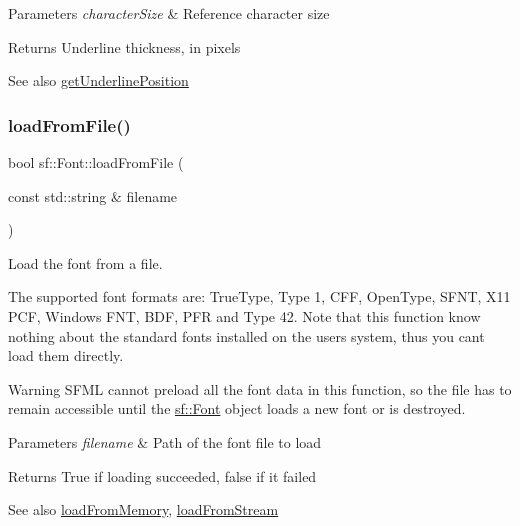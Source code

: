 \begin{DoxyParams}{Parameters}
{\em character\+Size} & Reference character size\\
\hline
\end{DoxyParams}
\begin{DoxyReturn}{Returns}
Underline thickness, in pixels
\end{DoxyReturn}
\begin{DoxySeeAlso}{See also}
\hyperlink{classsf_1_1_font_a726a55f40c19ac108e348b103190caad}{get\+Underline\+Position} 
\end{DoxySeeAlso}
\mbox{\label{classsf_1_1_font_ab020052ef4e01f6c749a85571c0f3fd1}} 
\subsubsection{\texorpdfstring{load\+From\+File()}{loadFromFile()}}
{\footnotesize\ttfamily bool sf\+::\+Font\+::load\+From\+File (\begin{DoxyParamCaption}\item[{const std\+::string \&}]{filename }\end{DoxyParamCaption})}



Load the font from a file. 

The supported font formats are\+: True\+Type, Type 1, C\+FF, Open\+Type, S\+F\+NT, X11 P\+CF, Windows F\+NT, B\+DF, P\+FR and Type 42. Note that this function know nothing about the standard fonts installed on the user\textquotesingle{}s system, thus you can\textquotesingle{}t load them directly.

\begin{DoxyWarning}{Warning}
S\+F\+ML cannot preload all the font data in this function, so the file has to remain accessible until the \hyperlink{classsf_1_1_font}{sf\+::\+Font} object loads a new font or is destroyed.
\end{DoxyWarning}

\begin{DoxyParams}{Parameters}
{\em filename} & Path of the font file to load\\
\hline
\end{DoxyParams}
\begin{DoxyReturn}{Returns}
True if loading succeeded, false if it failed
\end{DoxyReturn}
\begin{DoxySeeAlso}{See also}
\hyperlink{classsf_1_1_font_abf2f8d6de31eb4e1db02e061c323e346}{load\+From\+Memory}, \hyperlink{classsf_1_1_font_abc3f37a354ce8b9a21f8eb93bd9fdafb}{load\+From\+Stream} 
\end{DoxySeeAlso}
\mbox{\label{classsf_1_1_font_abf2f8d6de31eb4e1db02e061c323e346}} 
